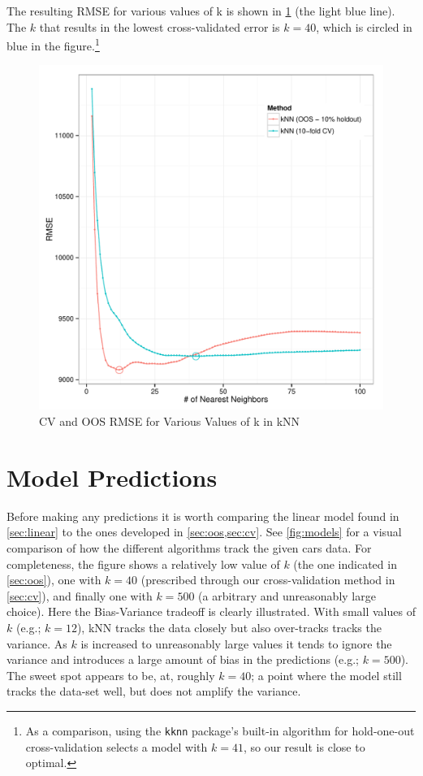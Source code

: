 \documentclass[11pt, fleqn]{article}
\begin{document}
The resulting RMSE for various values of k is shown in \cref{fig:sweep} (the light blue line). The \(k\) that results in the lowest cross-validated error is \(k=40\), which is circled in blue in the figure.\footnote{As a comparison, using the \texttt{kknn} package's built-in algorithm for hold-one-out cross-validation selects a model with \(k=41\), so our result is close to optimal.}

\begin{figure}[!htb]
  \centering
  \includegraphics[scale=.5]{sweep_kknn.pdf}
  \caption{CV and OOS RMSE for Various Values of k in kNN}
  \label{fig:sweep}
\end{figure}

\section{Model Predictions}
Before making any predictions it is worth comparing the linear model found in \cref{sec:linear} to the ones developed in \cref{sec:oos,sec:cv}.  See \cref{fig:models} for a visual comparison of how the different algorithms track the given cars data.  For completeness, the figure shows a relatively low value of $k$ (the one indicated in \cref{sec:oos}), one with $k=40$ (prescribed through our cross-validation method in \cref{sec:cv}), and finally one with $k=500$ (a arbitrary and unreasonably large choice).  Here the Bias-Variance tradeoff is clearly illustrated.  With small values of $k$ (e.g.; $k=12$), kNN tracks the data closely but also over-tracks tracks the variance.  As $k$ is increased to unreasonably large values it tends to ignore the variance and introduces a large amount of bias in the predictions (e.g.; $k=500$).  The sweet spot appears to be, at, roughly $k=40$; a point where the model still tracks the  data-set well, but does not amplify the variance.
\end{document}
